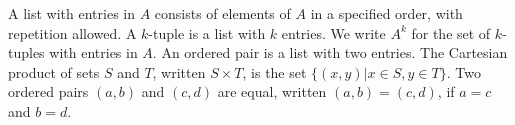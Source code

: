 \documentclass[../main.tex]{subfiles}
\begin{document}
\begin{defn}
    A \textsf{list} with entries in $A$ consists of elements of $A$ in a specified order, with repetition allowed.
    A $k$-tuple is a list with $k$ entries.
    We write $A^k$ for the set of $k$-tuples with entries in $A$.
    An \textsf{ordered pair} is a list with two entries.
    The \textsf{Cartesian product} of sets $S$ and $T$, written $S \times T$, is the set $\{ (x,y) | x \in S, y \in T\}$.
    Two ordered pairs $(a, b)$ and $(c, d)$ are \textsf{equal}, written $(a, b) = (c, d)$, if $a = c$ and $b = d$.
\end{defn}
\end{document}
